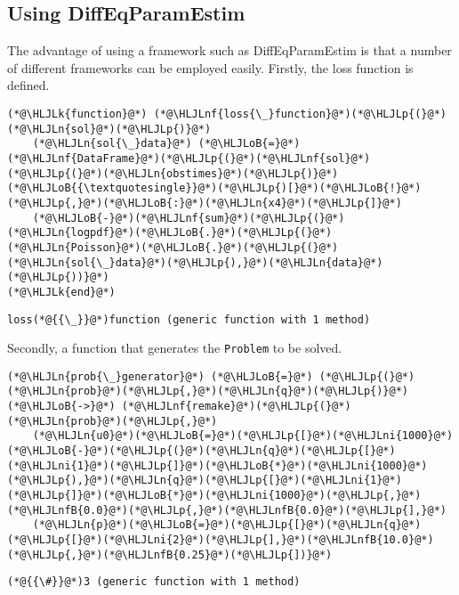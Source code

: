 \documentclass[12pt,a4paper]{article}
\newcommand{\HLJLk}[1]{\textcolor[RGB]{148,91,176}{\textbf{#1}}}
\newcommand{\HLJLn}[1]{#1}
\newcommand{\HLJLnf}[1]{\textcolor[RGB]{66,102,213}{#1}}
\newcommand{\HLJLnfB}[1]{\textcolor[RGB]{59,151,46}{#1}}
\newcommand{\HLJLni}[1]{\textcolor[RGB]{59,151,46}{#1}}
\newcommand{\HLJLoB}[1]{\textcolor[RGB]{102,102,102}{\textbf{#1}}}
\newcommand{\HLJLp}[1]{#1}
\begin{document}
\subsection{Using DiffEqParamEstim}
The advantage of using a framework such as DiffEqParamEstim is that a number of different frameworks can be employed easily. Firstly, the loss function is defined.


\begin{lstlisting}
(*@\HLJLk{function}@*) (*@\HLJLnf{loss{\_}function}@*)(*@\HLJLp{(}@*)(*@\HLJLn{sol}@*)(*@\HLJLp{)}@*)
    (*@\HLJLn{sol{\_}data}@*) (*@\HLJLoB{=}@*) (*@\HLJLnf{DataFrame}@*)(*@\HLJLp{(}@*)(*@\HLJLnf{sol}@*)(*@\HLJLp{(}@*)(*@\HLJLn{obstimes}@*)(*@\HLJLp{)}@*)(*@\HLJLoB{{\textquotesingle}}@*)(*@\HLJLp{)[}@*)(*@\HLJLoB{!}@*)(*@\HLJLp{,}@*)(*@\HLJLoB{:}@*)(*@\HLJLn{x4}@*)(*@\HLJLp{]}@*)
    (*@\HLJLoB{-}@*)(*@\HLJLnf{sum}@*)(*@\HLJLp{(}@*)(*@\HLJLn{logpdf}@*)(*@\HLJLoB{.}@*)(*@\HLJLp{(}@*)(*@\HLJLn{Poisson}@*)(*@\HLJLoB{.}@*)(*@\HLJLp{(}@*)(*@\HLJLn{sol{\_}data}@*)(*@\HLJLp{),}@*)(*@\HLJLn{data}@*)(*@\HLJLp{))}@*)
(*@\HLJLk{end}@*)
\end{lstlisting}

\begin{lstlisting}
loss(*@{{\_}}@*)function (generic function with 1 method)
\end{lstlisting}


Secondly, a function that generates the \texttt{Problem} to be solved.


\begin{lstlisting}
(*@\HLJLn{prob{\_}generator}@*) (*@\HLJLoB{=}@*) (*@\HLJLp{(}@*)(*@\HLJLn{prob}@*)(*@\HLJLp{,}@*)(*@\HLJLn{q}@*)(*@\HLJLp{)}@*) (*@\HLJLoB{->}@*) (*@\HLJLnf{remake}@*)(*@\HLJLp{(}@*)(*@\HLJLn{prob}@*)(*@\HLJLp{,}@*)
    (*@\HLJLn{u0}@*)(*@\HLJLoB{=}@*)(*@\HLJLp{[}@*)(*@\HLJLni{1000}@*)(*@\HLJLoB{-}@*)(*@\HLJLp{(}@*)(*@\HLJLn{q}@*)(*@\HLJLp{[}@*)(*@\HLJLni{1}@*)(*@\HLJLp{]}@*)(*@\HLJLoB{*}@*)(*@\HLJLni{1000}@*)(*@\HLJLp{),}@*)(*@\HLJLn{q}@*)(*@\HLJLp{[}@*)(*@\HLJLni{1}@*)(*@\HLJLp{]}@*)(*@\HLJLoB{*}@*)(*@\HLJLni{1000}@*)(*@\HLJLp{,}@*)(*@\HLJLnfB{0.0}@*)(*@\HLJLp{,}@*)(*@\HLJLnfB{0.0}@*)(*@\HLJLp{],}@*)
    (*@\HLJLn{p}@*)(*@\HLJLoB{=}@*)(*@\HLJLp{[}@*)(*@\HLJLn{q}@*)(*@\HLJLp{[}@*)(*@\HLJLni{2}@*)(*@\HLJLp{],}@*)(*@\HLJLnfB{10.0}@*)(*@\HLJLp{,}@*)(*@\HLJLnfB{0.25}@*)(*@\HLJLp{])}@*)
\end{lstlisting}

\begin{lstlisting}
(*@{{\#}}@*)3 (generic function with 1 method)
\end{lstlisting}
\end{document}
